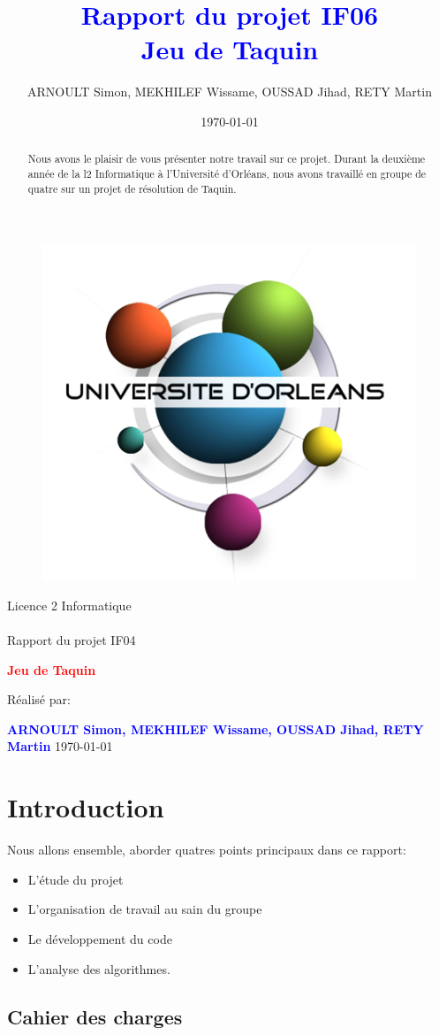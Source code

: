 ﻿\documentclass[a4paper,twoside,12pt]{report}
\title{\textcolor{blue}{\Large Rapport du projet IF06}\\\textcolor{blue}{\Large Jeu de Taquin}}
\author{ARNOULT Simon, MEKHILEF Wissame, OUSSAD Jihad, RETY Martin \date{\today}}
\begin{document}
\thispagestyle{empty}
%
\begin{figure}[H]
\includegraphics[width=0.2\linewidth]{Logo-univ-orleans.png}

\end{figure}
\vspace{2cm}
%
\begin{center}
{\Huge Licence 2 Informatique\\\ \\Rapport du projet IF04}
\par\vspace{1.4cm}

{\Huge\bf \textcolor{red}{\bf Jeu de Taquin}}
\par\vspace{1.6cm}

{\Large       Réalisé par:}
\par\vspace{1.3cm}
{\large\bf \textcolor{blue}{ARNOULT Simon, MEKHILEF Wissame, OUSSAD Jihad, RETY Martin}}
\vfill
\today
\end{center}
\newpage
\pagestyle{fancy}

\begin{abstract}
%
Nous avons le plaisir de vous présenter notre travail sur ce projet. Durant la deuxième année de la l2 Informatique
à l'Université d'Orléans, nous avons travaillé en groupe de quatre sur un projet de résolution de Taquin.
\end{abstract}
 
\newpage
\tableofcontents
\listoffigures
\newpage

\chapter{Introduction}
Nous allons ensemble, aborder quatres points principaux dans ce rapport:
\begin{itemize}
\item L'étude du projet
\item L'organisation de travail au sain du groupe
\item Le développement du code
\item L'analyse des algorithmes.
\end{itemize}
%
\section{Cahier des charges}
\end{document}

